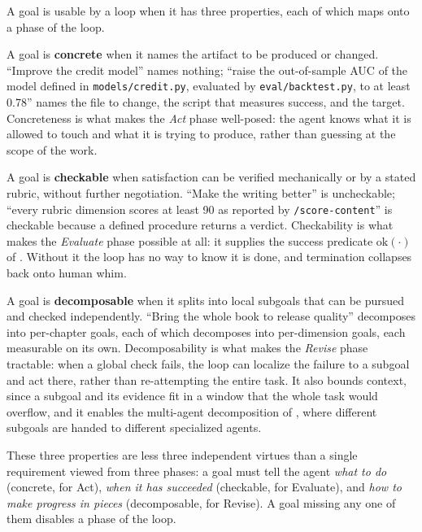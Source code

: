 A goal is usable by a loop when it has three properties, each of which maps onto a phase of the loop.

A goal is \textbf{concrete} when it names the artifact to be produced or changed. ``Improve the credit model'' names nothing; ``raise the out-of-sample AUC of the model defined in \texttt{models/credit.py}, evaluated by \texttt{eval/backtest.py}, to at least 0.78'' names the file to change, the script that measures success, and the target. Concreteness is what makes the \emph{Act} phase well-posed: the agent knows what it is allowed to touch and what it is trying to produce, rather than guessing at the scope of the work.

A goal is \textbf{checkable} when satisfaction can be verified mechanically or by a stated rubric, without further negotiation. ``Make the writing better'' is uncheckable; ``every rubric dimension scores at least 90 as reported by \texttt{/score-content}'' is checkable because a defined procedure returns a verdict. Checkability is what makes the \emph{Evaluate} phase possible at all: it supplies the success predicate $\mathrm{ok}(\cdot)$ of . Without it the loop has no way to know it is done, and termination collapses back onto human whim.

A goal is \textbf{decomposable} when it splits into local subgoals that can be pursued and checked independently. ``Bring the whole book to release quality'' decomposes into per-chapter goals, each of which decomposes into per-dimension goals, each measurable on its own. Decomposability is what makes the \emph{Revise} phase tractable: when a global check fails, the loop can localize the failure to a subgoal and act there, rather than re-attempting the entire task. It also bounds context, since a subgoal and its evidence fit in a window that the whole task would overflow, and it enables the multi-agent decomposition of , where different subgoals are handed to different specialized agents.

\begin{remark}
These three properties are less three independent virtues than a single requirement viewed from three phases: a goal must tell the agent \emph{what to do} (concrete, for Act), \emph{when it has succeeded} (checkable, for Evaluate), and \emph{how to make progress in pieces} (decomposable, for Revise). A goal missing any one of them disables a phase of the loop.
\end{remark}

